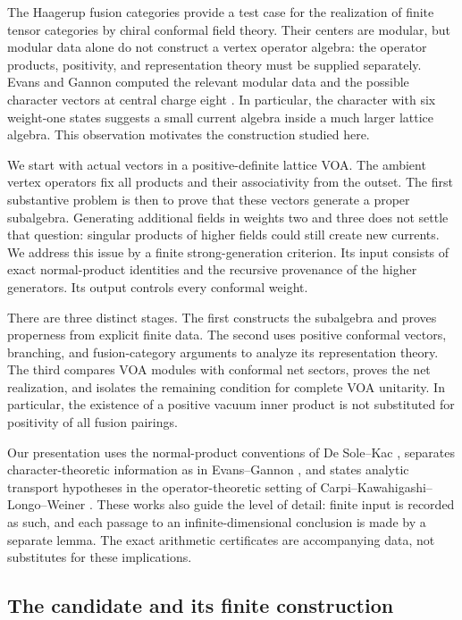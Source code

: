 \documentclass[11pt,a4paper]{article}
\theoremstyle{definition}
\begin{document}
The Haagerup fusion categories provide a test case for the realization of
finite tensor categories by chiral conformal field theory. Their centers
are modular, but modular data alone do not construct a vertex operator
algebra: the operator products, positivity, and representation theory
must be supplied separately. Evans and Gannon computed the relevant
modular data and the possible character vectors at central charge eight
\cite[Sections 2.4 and 5]{EG}. In particular, the character with six
weight-one states suggests a small current algebra inside a much larger
lattice algebra. This observation motivates the construction studied here.

We start with actual vectors in a positive-definite lattice VOA. The
ambient vertex operators fix all products and their associativity from
the outset. The first substantive problem is then to prove that these
vectors generate a proper subalgebra. Generating additional fields in
weights two and three does not settle that question: singular products
of higher fields could still create new currents. We address this issue
by a finite strong-generation criterion. Its input consists of exact
normal-product identities and the recursive provenance of the higher
generators. Its output controls every conformal weight.

There are three distinct stages. The first constructs the subalgebra and
proves properness from explicit finite data. The second uses positive
conformal vectors, branching, and fusion-category arguments to analyze
its representation theory. The third compares VOA modules with conformal
net sectors, proves the net realization, and isolates the remaining
condition for complete VOA unitarity. In particular,
the existence of a positive vacuum inner product is not substituted for
positivity of all fusion pairings.

Our presentation uses the normal-product conventions of De Sole--Kac
\cite[Section 2]{DSK}, separates character-theoretic information as in
Evans--Gannon \cite{EG}, and states analytic transport hypotheses in the
operator-theoretic setting of Carpi--Kawahigashi--Longo--Weiner \cite{CKLW}.
These works also guide the level of detail: finite input is recorded as
such, and each passage to an infinite-dimensional conclusion is made by
a separate lemma. The exact arithmetic certificates are accompanying
data, not substitutes for these implications.

\subsection{The candidate and its finite construction}
\end{document}
